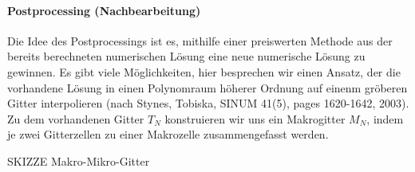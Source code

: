 \paragraph{Postprocessing (Nachbearbeitung)}
\label{sec:postpr-nachb}

Die Idee des Postprocessings ist es, mithilfe einer preiswerten Methode aus der bereits berechneten numerischen Lösung eine neue numerische Lösung zu gewinnen. Es gibt viele Möglichkeiten, hier besprechen wir einen Ansatz, der die vorhandene Lösung in einen Polynomraum höherer Ordnung auf einenm gröberen Gitter interpolieren (nach Stynes, Tobiska, SINUM 41(5), pages 1620-1642, 2003). Zu dem vorhandenen Gitter $T_{N}$ konstruieren wir uns ein Makrogitter $M_{N}$, indem je zwei Gitterzellen zu einer Makrozelle zusammengefasst werden. 

SKIZZE Makro-Mikro-Gitter

